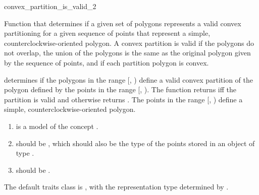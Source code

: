 \renewcommand\ccRefPageBegin{\ccParDims\cgalColumnLayout\begin{ccAdvanced}}
\renewcommand\ccRefPageEnd{\ccParDims\cgalColumnLayout\end{ccAdvanced}}
\begin{ccRefFunction}{convex_partition_is_valid_2}

\ccDefinition
Function that determines if a given set of polygons represents
a valid convex partitioning for a given sequence of points that represent a
simple, counterclockwise-oriented polygon.  
A convex partition is valid if the 
polygons do not overlap, the union of the polygons is the same as the original
polygon given by the sequence of points, and if each partition polygon is 
convex. 


{
determines if the polygons in the range [, )
define a valid convex partition of the polygon defined by the points in the 
range [, ). 
The function returns  iff the partition is valid and otherwise
returns .
\ccPrecond The points in the range [, ) 
define a simple, counterclockwise-oriented polygon.
}

\begin{enumerate}
    \item {} is a model of the concept
          .
    \item {} should be ,
          which should also be the type of the points stored in an object
          of type .
    \item {} should be 
          .
\end{enumerate}

The default traits class  is ,%
with the representation type determined by .


\end{ccRefFunction}
